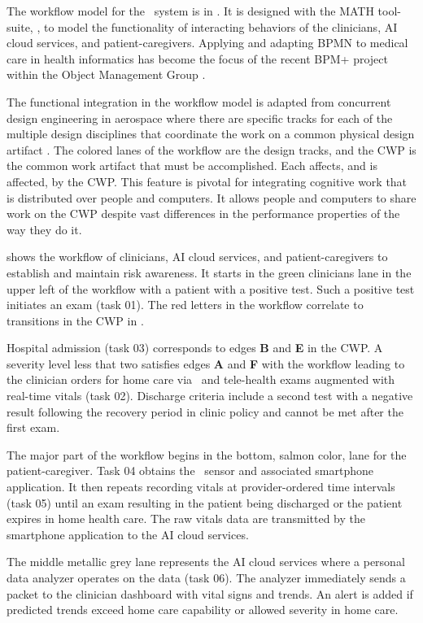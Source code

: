 The workflow model for the \phware\ system is in . It is designed with the MATH tool-suite, \cite{workflowmodel}, to model the functionality of interacting behaviors of the clinicians, AI cloud services, and patient-caregivers. Applying and adapting BPMN to medical care in health informatics has become the focus of the recent BPM+ project within the Object Management Group \cite{bpm}. 

The functional integration in the workflow model is adapted from concurrent design engineering in aerospace where there are specific tracks for each of the multiple design disciplines that coordinate the work on a common physical design artifact \cite{10.1007/978-1-4471-1538-0_9}. The colored lanes of the workflow are the design tracks, and the CWP is the common work artifact that must be accomplished. Each affects, and is affected, by the CWP. This feature is pivotal for integrating cognitive work that is distributed over people and computers. It allows people and computers to share work on the CWP despite vast differences in the performance properties of the way they do it. 

 shows the workflow of clinicians, AI cloud services, and patient-caregivers to establish and maintain risk awareness. It starts in the green clinicians lane in the upper left of the workflow with a patient with a positive test. Such a positive test initiates an exam (task 01). The red letters in the workflow correlate to transitions in the CWP in . 

Hospital admission (task 03) corresponds to edges \textbf{B} and \textbf{E} in the CWP. A severity level less that two satisfies edges \textbf{A} and \textbf{F} with the workflow leading to the clinician orders for home care via \phware\ and tele-health exams augmented with real-time vitals (task 02). Discharge criteria include a second test with a negative result following the recovery period in clinic policy and cannot be met after the first exam.

The major part of the workflow begins in the bottom, salmon color, lane for the patient-caregiver. Task 04 obtains the \phware\ sensor and associated smartphone application. It then repeats recording vitals at provider-ordered time intervals (task 05) until an exam resulting in the patient being discharged or the patient expires in home health care. The raw vitals data are transmitted by the smartphone application to the AI cloud services. 

The middle metallic grey lane represents the AI cloud services where a personal data analyzer operates on the data (task 06).  The analyzer immediately sends a packet to the clinician dashboard with vital signs and trends. An alert is added if predicted trends exceed home care capability or allowed severity in home care.

